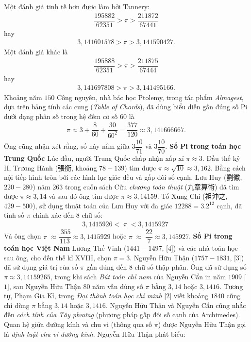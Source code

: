 \begin{multicols}{2}
	Một đánh giá tinh tế hơn được làm bởi Tannery:
	\begin{align*}
		\dfrac{{195882}}{{62351}} > \pi  > \dfrac{{211872}}{{67441}}
	\end{align*}
	hay 
	\begin{align*}
		3{,}141601578 > \pi  > 3{,}141590427.
	\end{align*}
	Một đánh giá khác là 
	\begin{align*}
		\dfrac{{195888}}{{62351}} > \pi  > \dfrac{{211875}}{{67444}}
	\end{align*}
	hay 
	\begin{align*}
		3{,}141697808 > \pi  > 3{,}141495166.
	\end{align*}
	Khoảng năm $150$ Công nguyên, nhà bác học Ptolemy, trong tác phẩm \textit{Almagest}, dựa trên bảng tính các cung (\textit{Table of Chords}), đã dùng biểu diễn gần đúng số Pi dưới dạng phân số trong hệ đếm cơ số $60$ là 
	\begin{align*}
		\pi  \approx 3 + \dfrac{8}{{60}} + \dfrac{{30}}{{{{60}^2}}} = \dfrac{{377}}{{120}} \approx 3{,}141666667.
	\end{align*}
	Ông cũng nhận xét rằng, số này nằm giữa $3\dfrac{{10}}{{71}}$  và  $3\dfrac{{10}}{{70}}.$
	\vskip 0.1cm
	\textbf{\color{lichsutoanhoc}Số Pi trong toán học Trung Quốc}
	\vskip 0.1cm
	Lúc đầu, người Trung Quốc chấp nhận xấp xỉ $\pi \approx 3$. Đầu thế kỷ II, Trương Hành (張衡, khoảng $78-139$) tìm được  $\pi  \approx \sqrt {10}  \approx 3{,}162$. Bằng cách nội tiếp hình tròn bởi các hình lục giác đều và gấp đôi số cạnh, Lưu Huy  (劉徽, $220-280$) năm $263$ trong cuốn sách Cửu \textit{chương toán thuật} (九章算術) đã tìm được $\pi  \approx 3{,}14$  và sau đó ông tìm được  $\pi  \approx 3{,}14159.$ Tổ Xung Chi (祖沖之, $429-500$), sử dụng thuật toán của Lưu Huy với đa giác $12288 = 3.{2^{12}}$  cạnh, đã tính số $\pi$  chính xác đến $8$ chữ số:
	\begin{align*}
		3{,}1415926 < \;\pi \; < 3{,}1415927\;
	\end{align*}
	Và ông chọn $\pi \; \approx \dfrac{{\;355}}{{113}} \approx 3{,}1415929$
	hoặc  $\pi \; \approx \;\dfrac{{22}}{7} \approx 3{,}145927$. 
	\vskip 0.1cm
	\textbf{\color{lichsutoanhoc}Số Pi trong toán học Việt Nam}
	\vskip 0.1cm
	Lương Thế Vinh ($1441-1497$, [$4$]) và các nhà toán học sau ông, cho đến thế kỉ XVIII, chọn $\pi = 3$.  Nguyễn Hữu Thận ($1757-1831$, [$3$]) đã sử dụng giá trị của số $\pi$ gần đúng đến $8$ chữ số thập phân. Ông đã sử dụng số $\pi  \approx 3{,}14159265$,  trong khi sách \textit{Bút toán chỉ nam} của Nguyễn Cẩn in năm $1909$ [$1$], sau Nguyễn Hữu Thận $80$ năm vẫn dùng số  $\pi$  bằng $3{,}14$ hoặc $3{,}1416$. Tương tự, Phạm Gia Kỉ, trong \textit{Đại thành toán học chỉ minh} [$2$] viết khoảng $1840$ cũng chỉ dùng $\pi$  bằng $3{,}14$ hoặc $3{,}1416$.  Nguyễn Hữu Thận và Nguyễn Cẩn cũng nhắc đến \textit{cách tính của Tây phương} (phương pháp gấp đôi số cạnh của Archimedes). Quan hệ giữa đường kính và chu vi (thông qua số  $\pi$) được Nguyễn Hữu Thận gọi là \textit{định luật chu vi đường kính}. Nguyễn Hữu Thận phát biểu:

\end{multicols}
